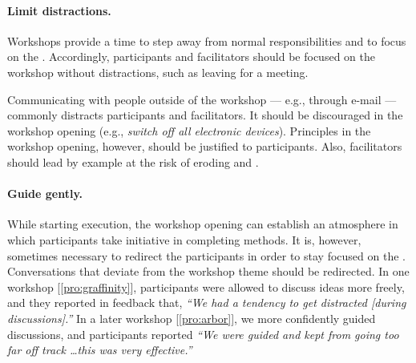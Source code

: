 \paragraph{Limit distractions.} Workshops provide a time to step away from normal responsibilities and to focus on the \topic. Accordingly, participants and facilitators should be focused on the workshop without distractions, such as leaving for a meeting. 

Communicating with people outside of the workshop --- e.g., through e-mail --- commonly distracts participants and facilitators. It should be discouraged in the workshop opening (e.g., \emph{switch off all electronic devices}). Principles in the workshop opening, however, should be justified to participants. Also, facilitators should lead by example at the risk of eroding \trust and \collegiality.


\paragraph{Guide gently.} While starting execution, the workshop opening can establish an atmosphere in which participants take initiative in completing methods. It is, however, sometimes necessary to redirect the participants in order to stay focused on the \topic. Conversations that deviate from the workshop theme should be redirected. In one workshop [\ref{pro:graffinity}], participants were allowed to discuss ideas more freely, and they reported in feedback that, {\it ``We had a tendency to get distracted [during discussions].''} In a later workshop [\ref{pro:arbor}], we more confidently guided discussions, and participants reported  \emph{\it ``We were guided and kept from going too far off track \ldots this was very effective.''}

